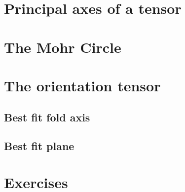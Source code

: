 \documentclass[a4paper , 12pt]{book}
\begin{document}
\section{Principal axes of a tensor}

\section{The Mohr Circle}

\section{The orientation tensor}

\subsection{Best fit fold axis}

\subsection{Best fit plane}

\section{Exercises}
\end{document}
